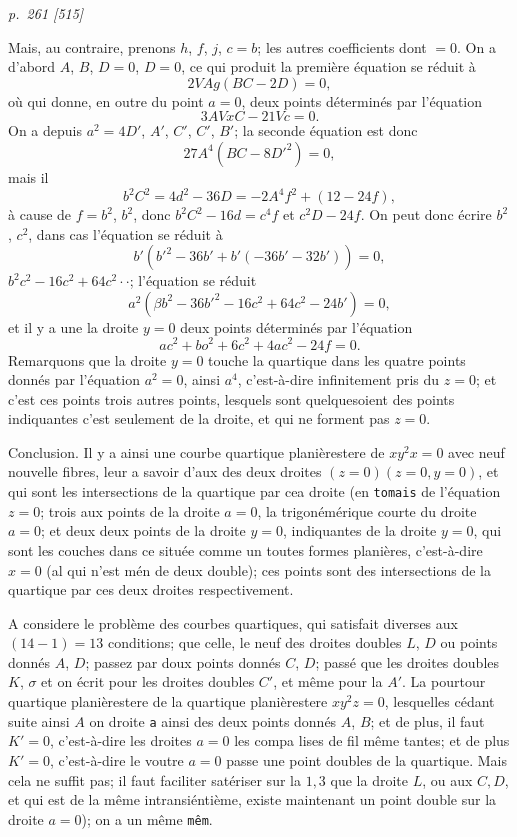 \documentclass[11pt,a4paper]{article}
\theoremstyle{plain}
\theoremstyle{definition}
\begin{document}
\bigskip
\textit{p.~261 [515]}
\smallskip

Mais, au contraire, prenons $h$, $f$, $j$, $c = b$; les autres coefficients dont $= 0$.  On a
d'abord $A$, $B$, $D = 0$, $D = 0$, ce qui produit la premi\`ere \'equation se r\'eduit \`a
\[
2VAg(BC - 2D) = 0,
\]
o\`u qui donne, en outre du point $a = 0$, deux points d\'etermin\'es par l'\'equation
\[
3AVxC - 21Vc = 0.
\]
On a depuis $a^2 = 4D'$, $A'$, $C'$, $C'$, $B'$; la seconde \'equation est donc
\[
27A^4(BC - 8D'^2) = 0,
\]
mais il
\[
b^2C^2 = 4d^2 - 36D = -2A^4f^2 + (12 - 24f),
\]
\`a cause de $f = b^2$, $b^2$, donc $b^2C^2 - 16d = c^4f$ et $c^2D - 24f$.  On peut donc
\'ecrire $b^2$, $c^2$, dans cas l'\'equation se r\'eduit \`a
\[
b'(b'^2 - 36b' + b'(- 36b' - 32b')) = 0,
\]
$b^2c^2 - 16c^2 + 64c^2 \cdot \cdot $; l'\'equation se r\'eduit
\[
a^2(\beta b^2 - 36b'^2 - 16c^2 + 64c^2 - 24b') = 0,
\]
et il y a une la droite $y = 0$ deux points d\'etermin\'es par l'\'equation
\[
ac^2 + bo^2 + 6c^2 + 4ac^2 - 24f = 0.
\]
Remarquons que la droite $y = 0$ touche la quartique dans les quatre points
donn\'es par l'\'equation $a^2 = 0$, ainsi $a^4$, c'est-\`a-dire infinitement pris du $z = 0$; et c'est ces points
trois autres points, lesquels sont quelquesoient des points indiquantes c'est seulement de la
droite, et qui ne forment pas $z = 0$.

Conclusion.  Il y a ainsi une courbe quartique plani\`erestere de $xy^2x = 0$ avec neuf
nouvelle fibres, leur a savoir d'aux des deux droites $(z = 0)(z = 0, y = 0)$, et qui sont
les intersections de la quartique par cea droite (en \texttt{tomais} de l'\'equation $z = 0$;
trois aux points de la droite $a = 0$, la trigon\'em\'erique courte du droite $a = 0$; et
deux deux points de la droite $y = 0$, indiquantes de la droite $y = 0$, qui sont les couches dans
ce situ\'ee comme un toutes formes plani\`eres, c'est-\`a-dire $x = 0$ (al qui n'est m\'en de deux
double); ces points sont des intersections de la quartique par ces deux droites respectivement.

A considere le probl\`eme des courbes quartiques, qui satisfait diverses aux $(14 - 1) = 13$
conditions; que celle, le neuf des droites doubles $L$, $D$ ou points donn\'es $A$, $D$;
passez par doux points donn\'es $C$, $D$;  pass\'e que les droites doubles $K$, $\sigma$ et
on \'ecrit pour les droites doubles $C'$, et m\^eme pour la $A'$.  La pourtour quartique
plani\`erestere de la quartique plani\`erestere $xy^2z = 0$, lesquelles c\'edant suite ainsi $A$ on droite \texttt{a} ainsi des deux
points donn\'es $A$, $B$; et de plus, il faut $K' = 0$, c'est-\`a-dire les droites $a = 0$
les compa lises de fil m\^eme tantes; et de plus $K' = 0$, c'est-\`a-dire le voutre $a = 0$
passe une point doubles de la quartique. Mais cela ne suffit pas; il faut faciliter
sat\'eriser sur la $1, 3$ que la droite $L$, ou aux $C, D$, et qui est de la m\^eme intransi\'enti\`eme,
existe maintenant un point double sur la droite $a = 0$); on a un m\^eme \texttt{m\^em}.
\end{document}
